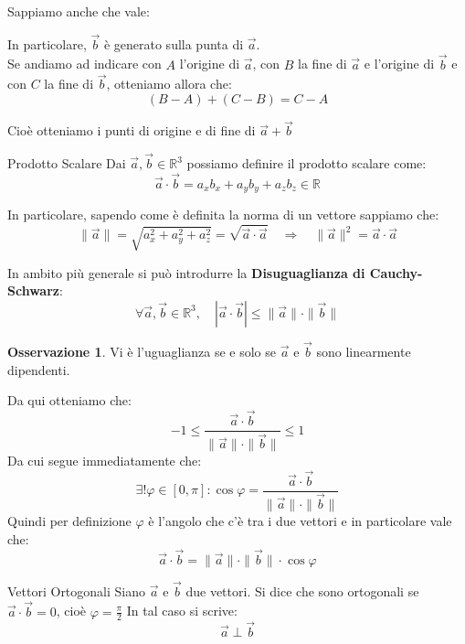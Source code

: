 \documentclass[11pt,a4paper,twoside]{article}
\theoremstyle{definition}
\newtheorem*{oss}{Osservazione}
\begin{document}
Sappiamo anche che vale:

\begin{center}
\end{center}

In particolare, $\vec b$ è generato sulla punta di $\vec a$.\\
Se andiamo ad indicare con $A$ l'origine di $\vec a$, con $B$ la fine di $\vec a$ e l'origine di $\vec b$ e con $C$ la fine di $\vec b$, otteniamo allora che:
\[
	(B-A) + (C-B) = C-A
\]

Cioè otteniamo i punti di origine e di fine di $\vec a + \vec b$

\begin{defn}{Prodotto Scalare}{}
	Dai $\vec a, \vec b \in \mathbb R^3$ possiamo definire il prodotto scalare come:
	\[ \vec a \cdot \vec b = a_xb_x + a_yb_y + a_zb_z \in \mathbb R \]
\end{defn}

In particolare, sapendo come è definita la norma di un vettore sappiamo che:
\[
	\|\vec a\| = \sqrt{a_x^2 + a_y^2 + a_z^2} = \sqrt{\vec a \cdot \vec a} \quad \Rightarrow \quad \|\vec a\|^2 = \vec a \cdot \vec a
\]

In ambito più generale si può introdurre la \textbf{Disuguaglianza di Cauchy-Schwarz}:
\[\forall \vec a, \vec b \in \mathbb R^3, \quad |\vec a \cdot \vec b|\leq \|\vec a\| \cdot \|\vec b\|\]

\begin{oss}
	Vi è l'uguaglianza se e solo se $\vec a$ e $\vec b$ sono linearmente dipendenti.
\end{oss}

Da qui otteniamo che: \[ -1\leq \frac{\vec a \cdot \vec b}{\|\vec a\| \cdot \|\vec b\|}\leq 1 \]
Da cui segue immediatamente che:
\[
	\exists ! \varphi \in [0, \pi]: \cos \varphi = \frac{\vec a \cdot \vec b}{\|\vec a\| \cdot \|\vec b\|}
\]
Quindi per definizione $\varphi$ è l'angolo che c'è tra i due vettori e in particolare vale che:
\[ \vec a \cdot \vec b = \|\vec a \| \cdot\|\vec b \| \cdot\cos \varphi \]

\begin{defn}{Vettori Ortogonali}{}
	Siano $\vec a$ e $\vec b$ due vettori. Si dice che sono ortogonali se $\vec a \cdot \vec b = 0$, cioè $\varphi = \frac \pi 2$
	In tal caso si scrive:
	\[ \vec a \perp \vec b \]
\end{defn}
\end{document}
